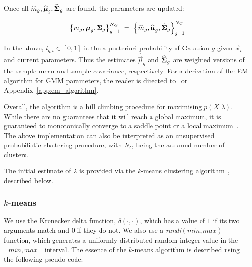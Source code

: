 \noindent
Once all $\widehat{m}_g, \widehat{{\boldsymbol{\mu}}}_g, \widehat{{\boldsymbol{\Sigma}}}_g$ are found, the parameters are updated:

\begin{equation}
\left\{ m_g, {\boldsymbol{\mu}}_g, {\boldsymbol{\Sigma}}_g \right\}_{g=1}^{N_G} ~ = ~ \left\{ \widehat{m}_g, \widehat{{\boldsymbol{\mu}}}_g, \widehat{{\boldsymbol{\Sigma}}}_g \right\}_{g=1}^{N_G} 
\end{equation}

\noindent In the above, $l_{g,i} \in [0,1]$ is the {a-posteriori} probability of Gaussian $g$ given $\Vec{x}_i$ and current parameters.
Thus the estimates $\widehat{\Vec{\mu}}_g$ and $\widehat{{\boldsymbol{\Sigma}}}_g$ are weighted versions of the
sample mean and sample covariance, respectively.
For a derivation of the EM algorithm for GMM parameters, the reader is directed to~\cite{Bilmes98, Redner84} or Appendix~\ref{app:em_algorithm}.

Overall, the algorithm is a hill climbing procedure for maximising $p(X | \lambda)$.
While there are no guarantees that it will reach a global maximum, it is guaranteed to monotonically converge to a saddle point or a local maximum~\cite{Dempster77,Duda01,Mitchell97}.
The above implementation can also be interpreted as an unsupervised probabilistic clustering procedure,
with $N_G$ being the assumed number of clusters.

The initial estimate of $\lambda$ is provided via the {\it k}-means clustering algorithm~\cite{Duda01},
described below.

%
%

\subsubsection{$k$-means}
\label{sec:ch_gmm_kmeans}

We use the Kronecker delta function, $\delta(\cdot,\cdot)$,
which has a value of $1$ if its two arguments match and $0$ if they do not.
We also use a {\it randi}$(min,max)$ function, 
which generates a uniformly distributed random integer value in the $[min,max]$ interval.
The essence of the $k$-means  algorithm is described using the following pseudo-code:

